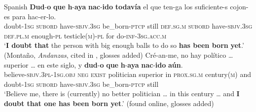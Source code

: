 \begin{exe}
	\ex \label{exInterrogativeYetSpanish}
	\begin{xlist}
		\exi{}Spanish
		\ex 
		\gll \textbf{Dud}-\textbf{o} \textbf{que} \textbf{h}-\textbf{aya} \textbf{nac}-\textbf{ido} \textbf{todavía} el que ten-ga los suficiente-s cojon-es para hac-er-lo.\\
	doubt-1\textsc{sg} \textsc{subord} have-\textsc{sbjv}.3\textsc{sg} be\_born-\textsc{ptcp} still \textsc{def}.\textsc{sg}.\textsc{m} \textsc{subord} have-\textsc{sbjv}.3\textsc{sg} \textsc{def}.\textsc{pl}.\textsc{m} enough-\textsc{pl} testicle(\textsc{m})-\textsc{pl} for do-\textsc{inf}-3\textsc{sg}.\textsc{acc}.\textsc{m}\\
	\glt \lq\textbf{I doubt that} the person with big enough balls to do so \textbf{has been born} \textbf{yet}.' (Montaño, \textit{Andanzas}, cited in \cite[§80.8m]{RAEGramatica}, glosses added)
		\ex
		\gll Cré-an-me, no hay político … superior … en este siglo, y \textbf{dud}-\textbf{o} \textbf{que} \textbf{h}-\textbf{aya} \textbf{nac}-\textbf{ido} \textbf{aún}.\\
	believe-\textsc{sbjv}.3\textsc{pl}-1\textsc{sg}.\textsc{obj} \textsc{neg} \textsc{exist} politician {} superior {} in \textsc{prox}.\textsc{sg}.\textsc{m} century(\textsc{m}) and doubt-1\textsc{sg} \textsc{subord} have-\textsc{sbjv}.3\textsc{sg} be\_born-\textsc{ptcp} still\\
	\glt \lq Believe me, there is (currently) no better politician … in this century … and \textbf{I doubt that one has been born yet}.\rq{ }(found online, glosses added)
	\end{xlist}
\end{exe}

